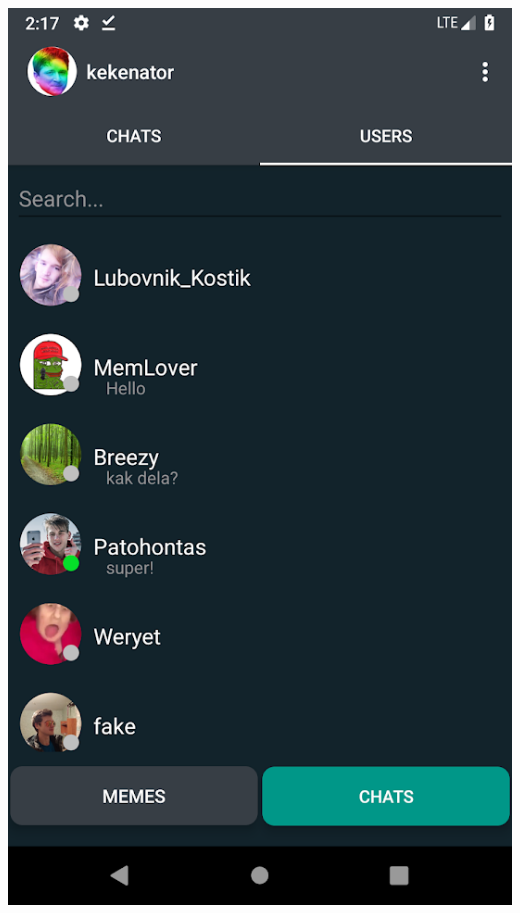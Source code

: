 \documentclass[xetex,mathserif,serif]{beamer}
\begin{document}
\begin{frame}
\begin{columns}[t]
                    \includegraphics[scale=0.179]{images/chats.png}

\end{columns}
\end{frame}
\end{document}

